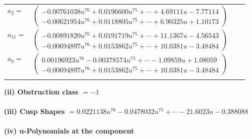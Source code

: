 \documentclass[1p]{elsarticle_modified}
\theoremstyle{definition}
\begin{document}
\begin{tabular}{m{7pt} m{180pt} m{7pt} m{180pt} }
\flushright $a_{2}=$&$\begin{pmatrix}-0.00761038 u^{76}+0.0196600 u^{75}+\cdots+4.69111 u-7.77114\\-0.00621954 u^{76}+0.0118805 u^{75}+\cdots+6.90325 u+1.10173\end{pmatrix}$ \\
\flushright $a_{11}=$&$\begin{pmatrix}-0.00891820 u^{76}+0.0191719 u^{75}+\cdots+11.1367 u-4.56543\\-0.00694897 u^{76}+0.0153862 u^{75}+\cdots+10.0381 u-3.48484\end{pmatrix}$ \\
\flushright $a_{8}=$&$\begin{pmatrix}0.00196923 u^{76}-0.00378574 u^{75}+\cdots-1.09859 u+1.08059\\-0.00694897 u^{76}+0.0153862 u^{75}+\cdots+10.0381 u-3.48484\end{pmatrix}$\\&\end{tabular}
\flushleft \textbf{(ii) Obstruction class $= -1$}\\~\\
\flushleft \textbf{(iii) Cusp Shapes $= 0.0221138 u^{76}-0.0478032 u^{75}+\cdots-21.6023 u-0.388088$}\\~\\
\newpage\renewcommand{\arraystretch}{1}
\flushleft \textbf{(iv) u-Polynomials at the component}\newline \\
\end{document}
